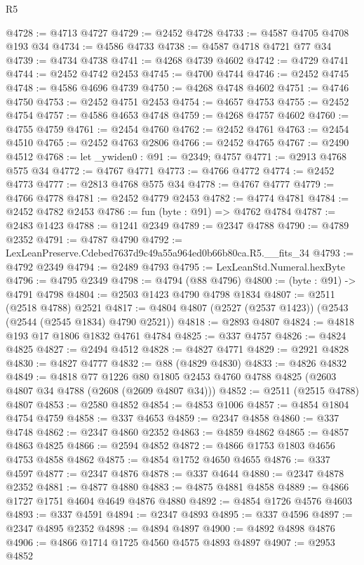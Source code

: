 \begin{lexlean}{R5}
\begin{coremodule}
@4728 := @4713 @4727
@4729 := @2452 @4728
@4733 := @4587 @4705 @4708 @193 @34
@4734 := @4586 @4733
@4738 := @4587 @4718 @4721 @77 @34
@4739 := @4734 @4738
@4741 := @4268 @4739 @4602
@4742 := @4729 @4741
@4744 := @2452 @4742 @2453
@4745 := @4700 @4744
@4746 := @2452 @4745
@4748 := @4586 @4696 @4739
@4750 := @4268 @4748 @4602
@4751 := @4746 @4750
@4753 := @2452 @4751 @2453
@4754 := @4657 @4753
@4755 := @2452 @4754
@4757 := @4586 @4653 @4748
@4759 := @4268 @4757 @4602
@4760 := @4755 @4759
@4761 := @2454 @4760
@4762 := @2452 @4761
@4763 := @2454 @4510
@4765 := @2452 @4763 @2806
@4766 := @2452 @4765
@4767 := @2490 @4512
@4768 := let _ywiden0 : @91 := @2349; @4757
@4771 := @2913 @4768 @575 @34
@4772 := @4767 @4771
@4773 := @4766 @4772
@4774 := @2452 @4773
@4777 := @2813 @4768 @575 @34
@4778 := @4767 @4777
@4779 := @4766 @4778
@4781 := @2452 @4779 @2453
@4782 := @4774 @4781
@4784 := @2452 @4782 @2453
@4786 := fun (byte : @91) => @4762 @4784
@4787 := @2483 @1423
@4788 := @1241 @2349
@4789 := @2347 @4788
@4790 := @4789 @2352
@4791 := @4787 @4790
@4792 := LexLeanPreserve.Cdebed7637d9c49a55a964ed0b66b80ca.R5.__fits_34
@4793 := @4792 @2349
@4794 := @2489 @4793
@4795 := LexLeanStd.Numeral.hexByte
@4796 := @4795 @2349
@4798 := @4794 (@88 @4796)
@4800 := (byte : @91) -> @4791 @4798
@4804 := @2503 @1423 @4790 @4798 @1834
@4807 := @2511 (@2518 @4788) @2521
@4817 := @4804 @4807 (@2527 (@2537 @1423)) (@2543 (@2544 (@2545 @1834) @4790 @2521))
@4818 := @2893 @4807
@4824 := @4818 @193 @17 @1806 @1832 @4761 @4784
@4825 := @337 @4757
@4826 := @4824 @4825
@4827 := @2494 @4512
@4828 := @4827 @4771
@4829 := @2921 @4828
@4830 := @4827 @4777
@4832 := @88 (@4829 @4830)
@4833 := @4826 @4832
@4849 := @4818
    @77
    @1226
    @80
    @1805
    @2453
    @4760
    @4788
    @4825
    (@2603 @4807 @34 @4788 (@2608 (@2609 @4807 @34)))
@4852 := @2511 (@2515 @4788) @4807
@4853 := @2580 @4852
@4854 := @4853 @1006
@4857 := @4854 @1804 @4754 @4759
@4858 := @337 @4653
@4859 := @2347 @4858
@4860 := @337 @4748
@4862 := @2347 @4860 @2352
@4863 := @4859 @4862
@4865 := @4857 @4863 @4825
@4866 := @2594 @4852
@4872 := @4866 @1753 @1803 @4656 @4753 @4858 @4862
@4875 := @4854 @1752 @4650 @4655
@4876 := @337 @4597
@4877 := @2347 @4876
@4878 := @337 @4644
@4880 := @2347 @4878 @2352
@4881 := @4877 @4880
@4883 := @4875 @4881 @4858
@4889 := @4866 @1727 @1751 @4604 @4649 @4876 @4880
@4892 := @4854 @1726 @4576 @4603
@4893 := @337 @4591
@4894 := @2347 @4893
@4895 := @337 @4596
@4897 := @2347 @4895 @2352
@4898 := @4894 @4897
@4900 := @4892 @4898 @4876
@4906 := @4866 @1714 @1725 @4560 @4575 @4893 @4897
@4907 := @2953 @4852

\end{coremodule}
\end{lexlean}
